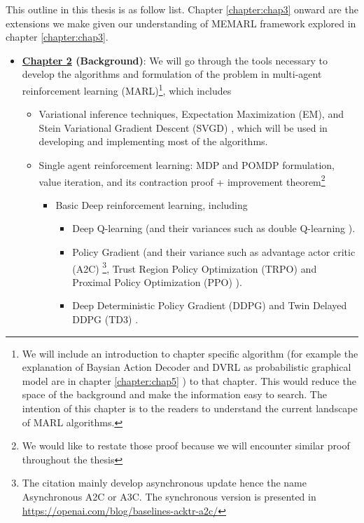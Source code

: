 \label{sec:chap1-Outline}
This outline in this thesis is as follow list. Chapter \ref{chapter:chap3} onward are the extensions we make given our understanding of MEMARL framework explored in chapter \ref{chapter:chap3}.
\begin{itemize}
    \item \textbf{\hyperref[chapter:chap2]{Chapter 2} (Background)}: We will go through the tools necessary to develop the algorithms and formulation of the problem in multi-agent reinforcement learning (MARL)\footnote{We will include an introduction to chapter specific algorithm (for example the explanation of Baysian Action Decoder \cite{foerster2018bayesian} and DVRL as probabilistic graphical model \cite{shvechikovjoint} are in chapter \ref{chapter:chap5} ) to that chapter. This would reduce the space of the background and make the information easy to search. The intention of this chapter is to the readers to understand the current landscape of MARL algorithms.}, which includes 
    \begin{itemize}
        \item Variational inference techniques, Expectation Maximization (EM), and Stein Variational Gradient Descent (SVGD) \cite{liu2016stein}, which will be used in developing and implementing most of the algorithms.
        \item Single agent reinforcement learning: MDP and POMDP formulation, value iteration, and its contraction proof + improvement theorem\footnote{We would like to restate those proof because we will encounter similar proof throughout the thesis}
        \begin{itemize}
            \item Basic Deep reinforcement learning, including
            \begin{itemize}
                \item  Deep Q-learning \cite{mnih2015human} (and their variances such as double Q-learning \cite{van2016deep}).
                \item Policy Gradient \cite{sutton2000policy} (and their variance such as advantage actor critic (A2C) \cite{mnih2016asynchronous}\footnote{The citation mainly develop asynchronous update hence the name Asynchronous A2C or A3C. The synchronous version is presented in \url{https://openai.com/blog/baselines-acktr-a2c/}}, Trust Region Policy Optimization (TRPO) \cite{schulman2015trust} and Proximal Policy Optimization (PPO) \cite{schulman2017proximal}).
                \item Deep Deterministic Policy Gradient (DDPG) \cite{lillicrap2015continuous} and Twin Delayed DDPG (TD3) \cite{fujimoto2018addressing}.

\end{itemize}
\end{itemize}
\end{itemize}
\end{itemize}
